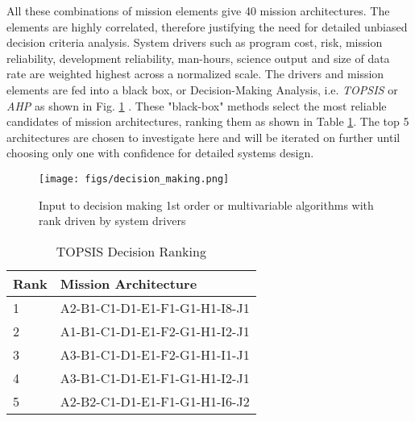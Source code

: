 All these combinations of mission elements give 40 mission architectures. The elements are highly correlated, therefore justifying the need for detailed unbiased decision criteria analysis. System drivers such as program cost, risk, mission reliability, development reliability, man-hours, science output and size of data rate are weighted highest across a normalized scale. The drivers and mission elements are fed into a black box, or Decision-Making Analysis, i.e. \emph{TOPSIS} or \emph{AHP} as shown in Fig. \ref{fig:decision_making} \cite{Cascales2012, Saaty1987}. These "black-box" methods select the most reliable candidates of mission architectures, ranking them as shown in Table \ref{tab:topsis}. The top 5 architectures are chosen to investigate here and will be iterated on further until choosing only one with confidence for detailed systems design.
\begin{figure}[htbp]
  \begin{center}
    \texttt{[image: figs/decision\_making.png]}
    \caption{Input to decision making 1st order or multivariable algorithms with rank driven by system drivers}
    \label{fig:decision_making}
\end{center}
\end{figure}
\begin{table}[htbp]
	\caption{TOPSIS Decision Ranking}
	\label{tab:topsis}
	\centering
		\begin{tabular}{|p{1.1cm}|p{5cm}|}
			\hline
		\textbf{Rank}	&		\textbf{Mission Architecture}	\\ 
			\hline 															  
			1 & A2-B1-C1-D1-E1-F1-G1-H1-I8-J1  \\
			\hline
			2 & A1-B1-C1-D1-E1-F2-G1-H1-I2-J1 \\
			\hline
			3  & A3-B1-C1-D1-E1-F2-G1-H1-I1-J1  \\
			\hline
			4  & A3-B1-C1-D1-E1-F1-G1-H1-I2-J1  \\
			\hline	
			5  & A2-B2-C1-D1-E1-F1-G1-H1-I6-J2  \\ \hline
		\end{tabular}
\end{table}
